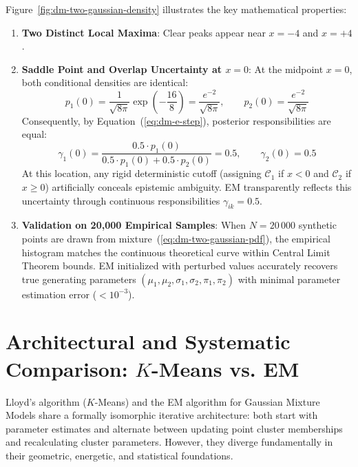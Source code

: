 Figure~\ref{fig:dm-two-gaussian-density} illustrates the key mathematical properties:
\begin{enumerate}
    \item \textbf{Two Distinct Local Maxima}: Clear peaks appear near $x = -4$ and $x = +4$.
    \item \textbf{Saddle Point and Overlap Uncertainty at $x = 0$}: At the midpoint $x = 0$, both conditional densities are identical:
    \begin{equation}
    p_1(0) = \frac{1}{\sqrt{8\pi}} \exp\left(-\frac{16}{8}\right) = \frac{e^{-2}}{\sqrt{8\pi}}, \qquad p_2(0) = \frac{e^{-2}}{\sqrt{8\pi}}
    \end{equation}
    Consequently, by Equation~(\ref{eq:dm-e-step}), posterior responsibilities are equal:
    \begin{equation}
    \gamma_{1}(0) = \frac{0.5 \cdot p_1(0)}{0.5 \cdot p_1(0) + 0.5 \cdot p_2(0)} = 0.5, \qquad \gamma_{2}(0) = 0.5
    \end{equation}
    At this location, any rigid deterministic cutoff (assigning $\mathcal{C}_1$ if $x < 0$ and $\mathcal{C}_2$ if $x \ge 0$) artificially conceals epistemic ambiguity. EM transparently reflects this uncertainty through continuous responsibilities $\gamma_{ik} = 0.5$.
    \item \textbf{Validation on 20,000 Empirical Samples}: When $N = 20\,000$ synthetic points are drawn from mixture~(\ref{eq:dm-two-gaussian-pdf}), the empirical histogram matches the continuous theoretical curve within Central Limit Theorem bounds. EM initialized with perturbed values accurately recovers true generating parameters $(\mu_1, \mu_2, \sigma_1, \sigma_2, \pi_1, \pi_2)$ with minimal parameter estimation error ($< 10^{-3}$).
\end{enumerate}

\section{Architectural and Systematic Comparison: \texorpdfstring{$K$}{K}-Means vs. EM}
\label{sec:dm-kmeans-em-comparison}

Lloyd's algorithm ($K$-Means) and the EM algorithm for Gaussian Mixture Models share a formally isomorphic iterative architecture: both start with parameter estimates and alternate between updating point cluster memberships and recalculating cluster parameters. However, they diverge fundamentally in their geometric, energetic, and statistical foundations.

